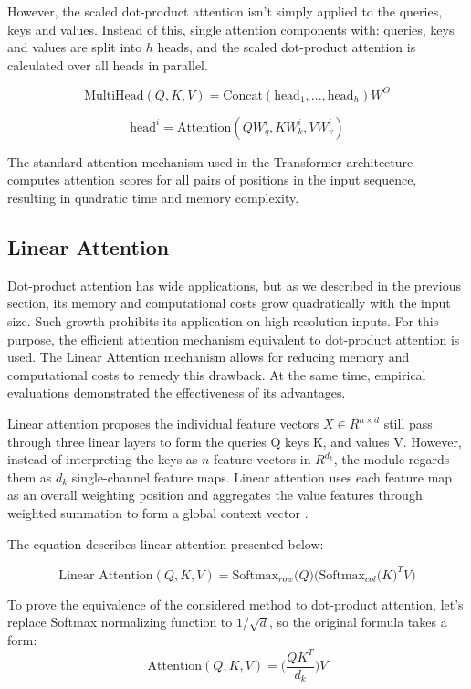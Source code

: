 However, the scaled dot-product attention isn't simply applied to the queries, keys and values. Instead of this, single attention components with: queries, keys and values are split into $ h $ heads, and the scaled dot-product attention is calculated over all heads in parallel.

$$ \text{MultiHead}(Q, K, V) = \text{Concat}(\text{head}_1,...,\text{head}_h)W^O $$

$$ \text{head}^i = \text{Attention}(QW_q^i, KW_k^i, VW_v^i) $$

The standard attention mechanism used in the Transformer architecture computes attention scores for all pairs of positions in the input sequence, resulting in quadratic time and memory complexity.


\subsection{Linear Attention}

Dot-product attention has wide applications, but as we described in the previous section, its memory and computational costs grow quadratically with the input size. Such growth prohibits its application on high-resolution inputs. For this purpose, the efficient attention mechanism equivalent to dot-product attention is used. The Linear Attention mechanism allows for reducing memory and computational costs to remedy this drawback. At the same time, empirical evaluations \cite{linear-attention-transformer} demonstrated the effectiveness of its advantages.

Linear attention proposes the individual feature vectors $ X \in R^{n \times d} $ still pass through three linear layers to form the queries Q keys K, and values V. However, instead of interpreting the keys as $n$ feature vectors in $R^{d_k}$, the module regards them as $d_k$ single-channel feature maps. Linear attention uses each feature map as an overall weighting position and aggregates the value features through weighted summation to form a global context vector \cite{efficient-linear-attention}. 

The equation describes linear attention presented below:

$$ \text{Linear Attention}(Q, K, V) = \text{Softmax}_{row} \big(Q)\big ( \text{Softmax}_{col} \big( K \big)^T V) $$ 

To prove the equivalence of the considered method to dot-product attention, let's replace Softmax normalizing function to $1 / \sqrt{d}$, so the original formula takes a form:
$$ \text{Attention}(Q, K, V) = \big( \frac{QK^T}{d_k} \big)V $$ 

